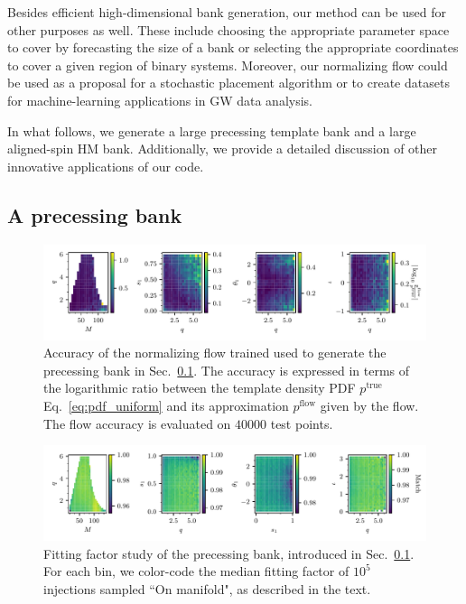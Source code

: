 \documentclass[twocolumn,showpacs,preprintnumbers,nofootinbib,prd,
superscriptaddress,10pt]{revtex4-2}
\begin{document}
Besides efficient high-dimensional bank generation, our method can be used for other purposes as well. These include choosing the appropriate parameter space to cover by forecasting the size of a bank or selecting the appropriate coordinates to cover a given region of binary systems. Moreover, our normalizing flow could be used as a proposal for a stochastic placement algorithm or to create datasets for machine-learning applications in GW data analysis.

In what follows, we generate a large precessing template bank and a large aligned-spin HM bank. Additionally, we provide a detailed discussion of other innovative applications of our code.

\subsection{A precessing bank} \label{sec:precessing_bank}

\begin{figure}[t]
		\includegraphics[scale = 1.]{precessing_flow_accuracy}
		\caption{Accuracy of the normalizing flow trained used to generate the precessing bank in Sec.~\ref{sec:precessing_bank}. The accuracy is expressed in terms of the logarithmic ratio between the template density PDF $p^\text{true}$ Eq.~\eqref{eq:pdf_uniform} and its approximation $p^\text{flow}$ given by the flow. The flow accuracy is evaluated on $40000$ test points.}
		\label{fig:precessing_flow}
\end{figure}

\begin{figure}[t]
		\includegraphics[scale = 1.]{precessing_injections}
		\caption{Fitting factor study of the precessing bank, introduced in Sec.~\ref{sec:precessing_bank}. For each bin, we color-code the median fitting factor of $10^5$ injections sampled ``On manifold", as described in the text.}
		\label{fig:precessing_fitting_factor}
\end{figure}
\end{document}
